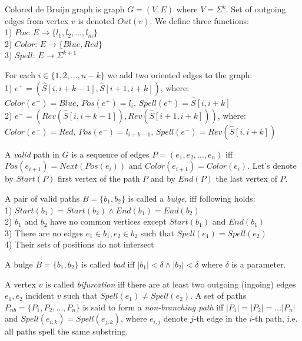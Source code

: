 \documentclass[a4paper, 12pt]{scrartcl}
\begin{document}
Colored de Bruijn graph is graph \(G = (V, E) \) where \(V = \Sigma ^ k \). Set of outgoing edges from vertex \(v\) is denoted \(Out(v)\). We define three functions: \\
1) \(Pos : \, E \rightarrow \lbrace l_1, l_2, \ldots , l_m \rbrace \) \\
2) \(Color : \, E \rightarrow \lbrace Blue, Red \rbrace \) \\
3) \(Spell: \, E \rightarrow \Sigma ^ {k + 1} \)

For each \(i \in \lbrace{1, 2, \ldots, n - k} \rbrace \) we add two oriented edges to the graph: \\
1) \(e^+ = (\hat{S}[i, i + k - 1], \hat{S}[i + 1, i + k]) \), where: \\
\(Color(e^+) = Blue, \,  Pos(e^+) = l_i, \, Spell(e^+) = \hat{S}[i, i + k] \) \\
2) \(e^- = (Rev(\hat{S}[i, i + k - 1]), Rev(\hat{S}[i + 1, i + k]))\), where: \\
 \(Color(e^-) = Red, \, Pos(e^-) = l_{i + k - 1}, \, Spell(e^-) = Rev(\hat{S}[i, i + k])\)

A \textit{valid} path in \(G\) is a sequence of edges \(P = (e_{1}, e_{2}, \ldots, e_{n})\) iff \(Pos(e_{i+1})  = Next(Pos(e_{i}))\) and
\(Color(e_{i + 1}) = Color(e_{i})\). Let's denote by \(Start(P)\) first vertex of the path \(P\) and by \(End(P)\) the last vertex of \(P\).

\newpage

A pair of valid paths \(B =\lbrace b_{1}, b_{2} \rbrace \)
is called a \textit{bulge}, iff following holds: \\
1) \(Start(b_{1}) = Start(b_{2}) \wedge End(b_{1}) = End(b_{2}) \) \\
2) \(b_{1}\) and \(b_{2}\) have no common vertices except \(Start(b_{1})\) and \(End(b_{1})\) \\
3) There are no edges \(e_{1} \in b_{1}, e_{2} \in b_{2} \) such that \(Spell(e_{1}) = Spell(e_{2})\) \\
4) Their sets of positions do not intersect

A bulge \(B =\lbrace b_{1}, b_{2} \rbrace \) is called \textit{bad} iff \(|b_1| < \delta \wedge |b_2| < \delta\) where \(\delta\) is a parameter.

A vertex \(v\) is called \textit{bifurcation} iff there are at least two outgoing (ingoing) edges \(e_{1}, e_{2}\) 
incident \(v\) such that \(Spell(e_{1}) \neq Spell(e_{2})\). A set of paths \(P_{nb} = \lbrace P_{1}, P_{2}, \ldots, P_{n} \rbrace\)
is said to form a \textit{non-branching path} iff \(|P_{1}| = |P_{2}| = \ldots |P_{n}| \) and \(Spell(e_{i, k}) = Spell(e_{j, k}) \),
where \(e_{i, j}\) denote \(j\)-th edge in the \(i\)-th path, i.e. all paths spell the same substring.
\end{document}
